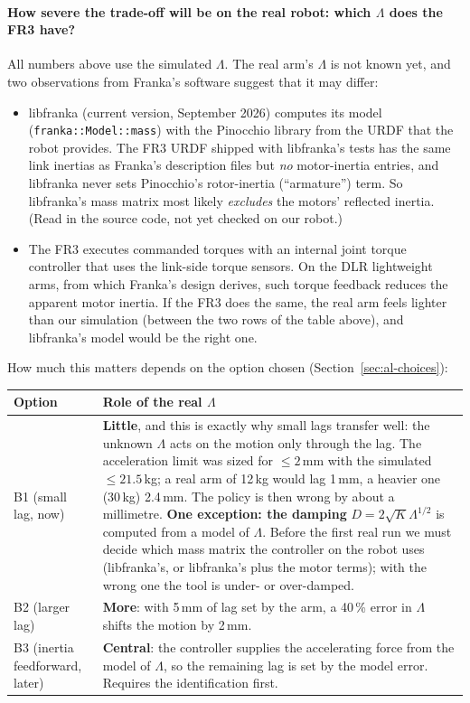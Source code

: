 \paragraph{How severe the trade-off will be on the real robot: which $\Lambda$ does the FR3 have?} All numbers above
use the simulated $\Lambda$. The real arm's $\Lambda$ is not known yet, and two observations from Franka's software
suggest that it may differ:
\begin{itemize}
  \item libfranka (current version, September 2026) computes its model (\texttt{franka::Model::mass}) with the
        Pinocchio library from the URDF that the robot provides. The FR3 URDF shipped with libfranka's tests has
        the same link inertias as Franka's description files but \emph{no} motor-inertia entries, and libfranka never
        sets Pinocchio's rotor-inertia (``armature'') term. So libfranka's mass matrix most likely \emph{excludes}
        the motors' reflected inertia. (Read in the source code, not yet checked on our robot.)
  \item The FR3 executes commanded torques with an internal joint torque controller that uses the link-side
        torque sensors. On the DLR lightweight arms, from which Franka's design derives, such torque feedback
        reduces the apparent motor inertia. If the FR3 does the same, the real arm feels lighter than our
        simulation (between the two rows of the table above), and libfranka's model would be the right one.
\end{itemize}
How much this matters depends on the option chosen (Section~\ref{sec:al-choices}):
\begin{center}
{\renewcommand{\arraystretch}{1.15}
\begin{tabular}{>{\raggedright\arraybackslash}p{}>{\raggedright\arraybackslash}p{}}
  \toprule
  Option & Role of the real $\Lambda$ \\
  \midrule
  B1 (small lag, now) & \textbf{Little}, and this is exactly why small lags transfer well: the unknown $\Lambda$
    acts on the motion only through the lag. The acceleration limit was sized for $\le 2$\,mm with the simulated
    $\le 21.5$\,kg; a real arm of 12\,kg would lag 1\,mm, a heavier one (30\,kg) 2.4\,mm. The policy is then wrong by about a
    millimetre. \textbf{One exception: the damping} $D = 2\sqrt K \Lambda^{1/2}$ is computed from a model of $\Lambda$.
    Before the first real run we must decide which mass matrix the controller on the robot uses (libfranka's, or
    libfranka's plus the motor terms); with the wrong one the tool is under- or over-damped. \\
  \addlinespace
  B2 (larger lag) & \textbf{More}: with 5\,mm of lag set by the arm, a 40\,\% error in $\Lambda$ shifts the motion by
    2\,mm. \\
  \addlinespace
  B3 (inertia feedforward, later) & \textbf{Central}: the controller supplies the accelerating force from the model
    of $\Lambda$, so the remaining lag is set by the model error. Requires the identification first. \\
  \bottomrule
\end{tabular}}
\end{center}

